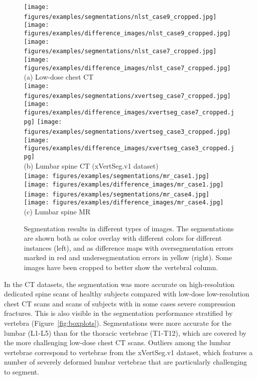 \documentclass[authoryear,5p,final,times]{elsarticle}
\begin{document}
	\begin{figure*}
		\centering
		\scriptsize
		\texttt{[image: figures/examples/segmentations/nlst\_case9\_cropped.jpg]}%
		\,%
		\texttt{[image: figures/examples/difference\_images/nlst\_case9\_cropped.jpg]}%
		\hfill%
		\texttt{[image: figures/examples/segmentations/nlst\_case7\_cropped.jpg]}%
		\,%
		\texttt{[image: figures/examples/difference\_images/nlst\_case7\_cropped.jpg]}%
		\\[0.25em]
		(a) Low-dose chest CT
		\\[1em]
		\texttt{[image: figures/examples/segmentations/xvertseg\_case7\_cropped.jpg]}%
		\,%
		\texttt{[image: figures/examples/difference\_images/xvertseg\_case7\_cropped.jpg]}%
		\hfill%
		\texttt{[image: figures/examples/segmentations/xvertseg\_case3\_cropped.jpg]}%
		\,%
		\texttt{[image: figures/examples/difference\_images/xvertseg\_case3\_cropped.jpg]}%
		\\[0.25em]
		(b) Lumbar spine CT (xVertSeg.v1 dataset)
		\\[1em]%
		\texttt{[image: figures/examples/segmentations/mr\_case1.jpg]}%
		\,%
		\texttt{[image: figures/examples/difference\_images/mr\_case1.jpg]}%
		\hfill%
		\texttt{[image: figures/examples/segmentations/mr\_case4.jpg]}%
		\,%
		\texttt{[image: figures/examples/difference\_images/mr\_case4.jpg]}%
		\\[0.25em]
		(c) Lumbar spine MR
		\caption{Segmentation results in different types of images. The segmentations are shown both as color overlay with different colors for different instances (left), and as difference maps with oversegmentation errors marked in red and undersegmentation errors in yellow (right). Some images have been cropped to better show the vertebral column.}
		\label{fig:examples_differences}
	\end{figure*}

	In the CT datasets, the segmentation was more accurate on high-resolution dedicated spine scans of healthy subjects compared with low-dose low-resolution chest CT scans and scans of subjects with in some cases severe compression fractures. This is also visible in the segmentation performance stratified by vertebra (Figure~\ref*{fig:boxplots}). Segmentations were more accurate for the lumbar (L1-L5) than for the thoracic vertebrae (T1-T12), which are covered by the more challenging low-dose chest CT scans. Outliers among the lumbar vertebrae correspond to vertebrae from the xVertSeg.v1 dataset, which features a number of severely deformed lumbar vertebrae that are particularly challenging to segment.
\end{document}
